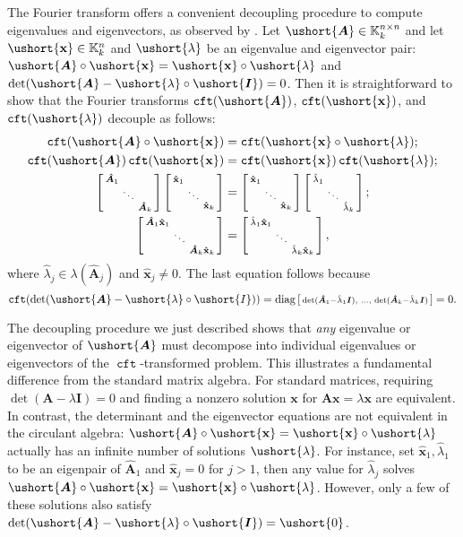 \documentclass[1p,authoryear,letterpaper]{elsarticle}
\providecommand{\KK}{\mathbb{K}}
\providecommand{\sbmat}[1]{\left[\begin{smallmatrix} #1 \end{smallmatrix}\right]}
\providecommand{\mat}{\boldsymbol}
\renewcommand{\vec}{\mathbf}
\providecommand{\eye}{\mat{I}}
\providecommand{\mA}{\ensuremath{\mat{A}}}
\providecommand{\mhat}[1]{\ensuremath{\mat{\hat{#1}}}}
\providecommand{\vhat}[1]{\ensuremath{\vec{\hat{#1}}}}
\providecommand{\mAhat}{\mhat{A}}
\providecommand{\vxhat}{\vhat{x}}
\providecommand{\vx}{\ensuremath{\vec{x}}}
\DeclareMathOperator{\fft}{\texttt{cft}}
\newcommand{\cel}[1]{\ushort{#1}}
\newcommand{\celm}[1]{\cel{\mat{#1}}}
\newcommand{\celv}[1]{\cel{\vec{#1}}}
\newcommand{\clambda}{\ensuremath{\cel{\lambda}}}
\newcommand{\cI}{\ensuremath{\cel{I}}}
\newcommand{\cvx}{\ensuremath{\celv{x}}}
\providecommand{\cmA}{\ensuremath{\celm{A}}}
\providecommand{\cmI}{\ensuremath{\celm{I}}}
\begin{document}
The Fourier transform offers a
convenient decoupling procedure to compute eigenvalues and eigenvectors,
as observed by \citet{braman201x-tensor-eigenvalues}.
 Let $\cmA \in \KK_k^{n \times n}$ and let
$\cvx \in \KK_k^n$ and $\clambda$ be an eigenvalue
and eigenvector pair: $\cmA \circ \cvx = \cvx \circ \clambda$
and $\det(\cmA - \clambda \circ \cmI) = 0$.
Then it is straightforward to show that the Fourier transforms $\fft(\cmA)$, $\fft(\cvx)$,
and $\fft(\clambda)$ decouple as follows:
\[\begin{aligned}
 \fft(\cmA \circ \cvx) & = \fft(\cvx \circ \clambda) ; \\
 \fft(\cmA) \fft(\cvx) & = \fft(\cvx) \fft(\clambda) ; \\
  \sbmat{\mAhat_1 \\ & \ddots \\ & & \mAhat_k}
  \sbmat{\vxhat_1 \\ & \ddots \\ & & \vxhat_k}
  & = \sbmat{\vxhat_1 \\ & \ddots \\ & & \vxhat_k}
    \sbmat{ \hat{\lambda}_1 \\ & \ddots \\ & & \hat{\lambda}_k } ;
  \\
 \sbmat{\mAhat_1 \vxhat_1 \\ & \ddots \\ & & \mAhat_k \vxhat_k}
 & = \sbmat{ \hat{\lambda}_1 \vxhat_1 \\ & \ddots \\ & & \hat{\lambda}_k \vxhat_k },
  \end{aligned}
\]
where $\hat{\lambda}_j \in \lambda(\mAhat_j)$ and $\vxhat_j \not= 0$.
The last equation follows because
\[\fft(\det(\cmA - \clambda \circ \cI)) =
   \diag\sbmat{\det(\mAhat_1 - \hat{\lambda}_1 \eye), & \ldots, & \det(\mAhat_k - \hat{\lambda}_k \eye)}
   = 0.
\]

The decoupling procedure we just described shows that \emph{any}
eigenvalue or eigenvector of $\cmA$ must
decompose into individual eigenvalues or eigenvectors of the
$\fft$-transformed problem.
This illustrates a fundamental difference from the
standard matrix algebra. For standard matrices, requiring
$\det(\mA - \lambda \eye) = 0$ and finding a nonzero solution
$\vx$ for $\mA \vx=\lambda \vx$ are equivalent. In contrast,
the determinant and the eigenvector
equations are not  equivalent in the circulant algebra:
$\cmA \circ \cvx = \cvx \circ \clambda$ actually has an
infinite number of solutions $\clambda$.  For instance,
set $\vxhat_1, \hat{\lambda}_1$
to be an eigenpair of $\mAhat_1$ and $\vxhat_j=0$ for $j>1$, then any
value for $\hat{\lambda}_j$ solves $\cmA \circ \cvx = \cvx \circ \clambda$.
However, only a few of these solutions also satisfy
$\det(\cmA - \clambda \circ \cmI)=\cel{0}$.
\end{document}
